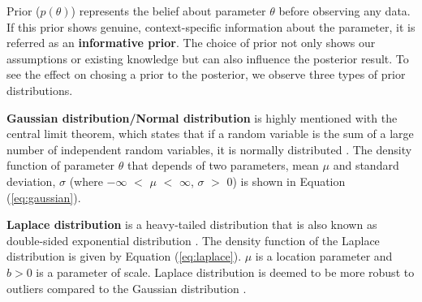 \documentclass[ %
                    author={Revalda Putawara},
                supervisor={Dr. James Pope},
                    degree={MSc},
                     title={Robustness of Bayesian Neural Networks Design Choices Against Weight and Bias Perturbation Induced by Single Event Upsets (SEUs)},
                      type={},
                      year={2025}]{dissertation}
\begin{document}
Prior ($p(\theta)$) represents the belief about parameter $\theta$ before observing any data. If this prior shows genuine, context-specific information about the parameter, it is referred as an \textbf{informative prior}. The choice of prior not only shows our assumptions or existing knowledge but can also influence the posterior result. To see the effect on chosing a prior to the posterior, we observe three types of prior distributions.




\textbf{Gaussian distribution/Normal distribution} is highly mentioned with the central limit theorem, which states that if a random variable is the sum of a large number of independent random variables, it is normally distributed \cite{ricemathstats2007}. The density function of parameter $\theta$ that depends of two parameters, mean $\mu$ and standard deviation, $\sigma$ (where $-\infty$ $<$ $\mu$ $<$ $\infty$, $\sigma$ $>$ 0) is shown in Equation (\ref{eq:gaussian}).



\textbf{Laplace distribution} is a heavy-tailed distribution that is also known as double-sided exponential distribution \cite{murphy2012}. The density function of the Laplace distribution is given by Equation (\ref{eq:laplace}). $\mu$ is a location parameter and $b > 0$ is a parameter of scale. Laplace distribution is deemed to be more robust to outliers compared to the Gaussian distribution \cite{murphy2012}.
\end{document}

